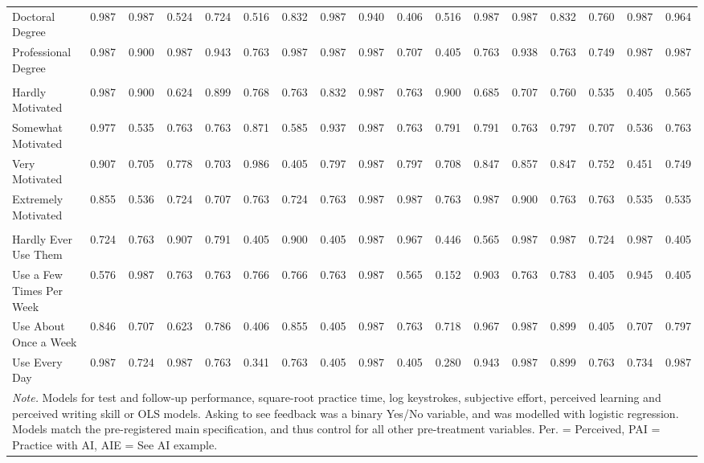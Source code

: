 \documentclass[11pt]{report}
\begin{document}
\begin{append}
\begin{table}[ht]
\begin{tabular}{@{\extracolsep{-4pt}}lcccccccccccccccc}
    Doctoral Degree & 0.987 & 0.987 & 0.524 & 0.724 & 0.516 & 0.832 & 0.987 & 0.940 & 0.406 & 0.516 & 0.987 & 0.987 & 0.832 & 0.760 & 0.987 & 0.964 \\ 
    Professional Degree & 0.987 & 0.900 & 0.987 & 0.943 & 0.763 & 0.987 & 0.987 & 0.987 & 0.707 & 0.405 & 0.763 & 0.938 & 0.763 & 0.749 & 0.987 & 0.987 \\ 
    \midrule
    \addlinespace[2.5pt]
    \multicolumn{17}{l}{\textbf{Motivation}} \\ 
    \midrule
    Hardly Motivated & 0.987 & 0.900 & 0.624 & 0.899 & 0.768 & 0.763 & 0.832 & 0.987 & 0.763 & 0.900 & 0.685 & 0.707 & 0.760 & 0.535 & 0.405 & 0.565 \\ 
    Somewhat Motivated & 0.977 & 0.535 & 0.763 & 0.763 & 0.871 & 0.585 & 0.937 & 0.987 & 0.763 & 0.791 & 0.791 & 0.763 & 0.797 & 0.707 & 0.536 & 0.763 \\ 
    Very Motivated & 0.907 & 0.705 & 0.778 & 0.703 & 0.986 & 0.405 & 0.797 & 0.987 & 0.797 & 0.708 & 0.847 & 0.857 & 0.847 & 0.752 & 0.451 & 0.749 \\ 
    Extremely Motivated & 0.855 & 0.536 & 0.724 & 0.707 & 0.763 & 0.724 & 0.763 & 0.987 & 0.987 & 0.763 & 0.987 & 0.900 & 0.763 & 0.763 & 0.535 & 0.535 \\ 
    \midrule
    \addlinespace[2.5pt]
    \multicolumn{17}{l}{\textbf{Experience with AI Writing Assistants}} \\ 
    \midrule
    Hardly Ever Use Them & 0.724 & 0.763 & 0.907 & 0.791 & 0.405 & 0.900 & 0.405 & 0.987 & 0.967 & 0.446 & 0.565 & 0.987 & 0.987 & 0.724 & 0.987 & 0.405 \\ 
    Use a Few Times Per Week & 0.576 & 0.987 & 0.763 & 0.763 & 0.766 & 0.766 & 0.763 & 0.987 & 0.565 & 0.152 & 0.903 & 0.763 & 0.783 & 0.405 & 0.945 & 0.405 \\ 
    Use About Once a Week & 0.846 & 0.707 & 0.623 & 0.786 & 0.406 & 0.855 & 0.405 & 0.987 & 0.763 & 0.718 & 0.967 & 0.987 & 0.899 & 0.405 & 0.707 & 0.797 \\ 
    Use Every Day & 0.987 & 0.724 & 0.987 & 0.763 & 0.341 & 0.763 & 0.405 & 0.987 & 0.405 & 0.280 & 0.943 & 0.987 & 0.899 & 0.763 & 0.734 & 0.987 \\ 
    \midrule
    \multicolumn{17}{p{\textwidth}}{\textit{Note.} Models for test and follow-up performance, square-root practice time, log keystrokes, subjective effort, perceived learning and perceived writing skill or OLS models. Asking to see feedback was a binary Yes/No variable, and was modelled with logistic regression. Models match the pre-registered main specification, and thus control for all other pre-treatment variables. Per. = Perceived, PAI = Practice with AI, AIE = See AI example.}
\vspace{5pt}
    \end{tabular}
\end{table}


\end{append}

\begin{bibliof}

\end{bibliof}
\end{document}
